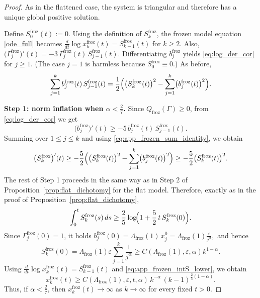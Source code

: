 \documentclass[reqno,11pt]{amsart}
\begin{document}
\begin{proof}
As in the flattened case, the system is triangular and therefore has a unique global
positive solution.

Define $S_0^{\mathrm{froz}}(t):=0.$
Using the definition of $S_k^{\mathrm{froz}}$, the frozen model equation \eqref{ode_full} becomes
$\frac{d}{dt}\log x_k^{\mathrm{froz}}(t)=S_{k-1}^{\mathrm{froz}}(t)$ for $k\geq 2$.
Also,$\bigl(\Gamma_j^{\mathrm{froz}}\bigr)'(t)
=
-3\,\Gamma_j^{\mathrm{froz}}(t)\,S_{j-1}^{\mathrm{froz}}(t).$
Differentiating $b_j^{\mathrm{froz}}$ yields \eqref{eq:log_der_cor} for $j\geq 1$.
(The case $j=1$ is harmless because $S_0^{\mathrm{froz}}\equiv0$.)  As before,
\begin{equation}
\label{eq:app_frozen_sum_identity}
\sum_{j=1}^k b_j^{\mathrm{froz}}(t)\,S_{j-1}^{\mathrm{froz}}(t)
=
\frac12\Bigl(\bigl(S_k^{\mathrm{froz}}(t)\bigr)^2
-\sum_{j=1}^k \bigl(b_j^{\mathrm{froz}}(t)\bigr)^2\Bigr).
\end{equation}

\medskip
\noindent\textbf{Step 1: norm inflation when $\alpha<\frac27$.}
Since $Q_{\mathrm{froz}}(\Gamma)\ge0$, from \eqref{eq:log_der_cor} we get
\[
\bigl(b_j^{\mathrm{froz}}\bigr)'(t)\ge
-5\,b_j^{\mathrm{froz}}(t)\,S_{j-1}^{\mathrm{froz}}(t).
\]
Summing over $1\le j\le k$ and using \eqref{eq:app_frozen_sum_identity}, we obtain
\[
\bigl(S_k^{\mathrm{froz}}\bigr)'(t)
\ge
-\frac52\Bigl(\bigl(S_k^{\mathrm{froz}}(t)\bigr)^2
-\sum_{j=1}^k \bigl(b_j^{\mathrm{froz}}(t)\bigr)^2\Bigr)
\ge
-\frac52\bigl(S_k^{\mathrm{froz}}(t)\bigr)^2.
\]
The rest of Step 1 proceeds in the same way as in Step 2 of Proposition~\ref{prop:flat_dichotomy} for the flat model.
Therefore, exactly as in the proof of Proposition~\ref{prop:flat_dichotomy},
\begin{equation}
\label{eq:app_frozen_intS_lower}
\int_0^t S_k^{\mathrm{froz}}(s)\,ds
\ge
\frac25\log\!\Bigl(1+\frac52\,t\,S_k^{\mathrm{froz}}(0)\Bigr).
\end{equation}
Since $\Gamma_j^{\mathrm{froz}}(0)=1$,
it holds $
b_j^{\mathrm{froz}}(0)
=
\Lambda_{\mathrm{froz}}(1)\,x_j^0
=
\Lambda_{\mathrm{froz}}(1)\frac{\varepsilon}{j^\alpha}, $
and hence
\[
S_k^{\mathrm{froz}}(0)
=
\Lambda_{\mathrm{froz}}(1)\varepsilon\sum_{j=1}^k \frac{1}{j^\alpha}
\geq 
C(\Lambda_{\mathrm{froz}}(1), \varepsilon,\alpha)
k^{1-\alpha}.
\]
Using $\frac{d}{dt}\log x_k^{\mathrm{froz}}(t)=S_{k-1}^{\mathrm{froz}}(t)$ and \eqref{eq:app_frozen_intS_lower}, we obtain
\begin{equation*}
x_k^{\mathrm{froz}}(t)
\geq
C(\Lambda_{\mathrm{froz}}(1),\varepsilon,t,\alpha)
\, 
k^{-\alpha}
\,
(k-1)^{\frac25(1-\alpha)}.
\end{equation*}
Thus, if $\alpha<\frac27$, then $x_k^{\mathrm{froz}}(t)\to\infty$ as $k\to\infty$ for every
fixed $t>0$.


\end{proof}
\end{document}

